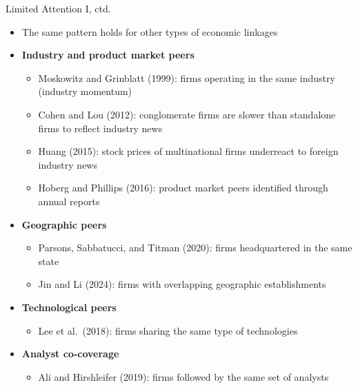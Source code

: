 \documentclass[aspectratio=169, 11pt]{beamer}
\begin{document}
\begin{frame}[shrink=5]{Limited Attention I, ctd.}
\begin{itemize}
\item The same pattern holds for other types of economic linkages
\item \textbf{Industry and product market peers}
  \begin{itemize}
  \item Moskowitz and Grinblatt (1999): firms operating in the same industry (industry momentum)
  \item Cohen and Lou (2012): conglomerate firms are slower than standalone firms to reflect industry news
  \item Huang (2015): stock prices of multinational firms underreact to foreign industry news
  \item Hoberg and Phillips (2016): product market peers identified through annual reports
  \end{itemize}
\item \textbf{Geographic peers}
  \begin{itemize}
  \item Parsons, Sabbatucci, and Titman (2020): firms headquartered in the same state
  \item Jin and Li (2024): firms with overlapping geographic establishments
  \end{itemize}
\item \textbf{Technological peers}
  \begin{itemize}
  \item Lee et al.\ (2018): firms sharing the same type of technologies
  \end{itemize}
\item \textbf{Analyst co-coverage}
  \begin{itemize}
  \item Ali and Hirshleifer (2019): firms followed by the same set of analysts
  \end{itemize}
\end{itemize}
\end{frame}
\end{document}
